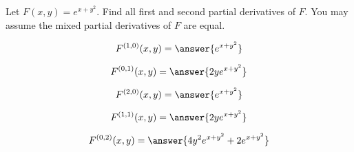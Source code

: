 \documentclass{ximera}
\author{David Guichard \and Neal Koblitz \and H. Jerome Keisler \and Albert Scheller \and Barry Balof \and Mike Wills \and Matthew Carr}
\begin{document}
\begin{exercise}




Let $F(x,y)=e^{x+y^2}$. Find all first and second partial derivatives of $F$. You may assume the mixed partial derivatives of $F$ are equal.

\begin{prompt}
\[
F^{(1,0)}(x,y)=\answer{e^{x+y^2}}
\]
\end{prompt}
\begin{prompt}
\[
F^{(0,1)}(x,y)=\answer{2ye^{x+y^2}}
\]
\end{prompt}
\begin{prompt}
\[
F^{(2,0)}(x,y)=\answer{e^{x+y^2}}
\]
\end{prompt}
\begin{prompt}
\[
F^{(1,1)}(x,y)=\answer{2ye^{x+y^2}}
\]
\end{prompt}
\begin{prompt}
\[
F^{(0,2)}(x,y)=\answer{4y^2 e^{x+y^2}+2e^{x+y^2}}
\]
\end{prompt}

\end{exercise}
\end{document}
